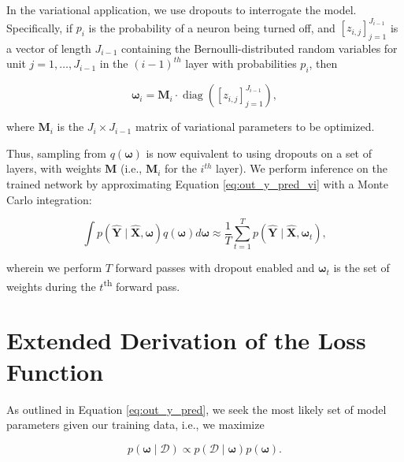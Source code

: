 In the variational application, we use dropouts to interrogate the model. 
Specifically, 
if $p_{i}$ is the probability of a neuron being turned off, and
$\left[z_{i, j}\right]_{j=1}^{J_{i-1}}$ is a vector of length $J_{i-1}$ containing the Bernoulli-distributed random variables for unit $j=1, \ldots, J_{i-1}$ in the $(i-1)^{th}$ layer with probabilities $p_i$, then

\begin{equation}
\boldsymbol{\omega}_{i} =\boldsymbol{M}_{i} \cdot \operatorname{diag}\left(\left[z_{i, j}\right]_{j=1}^{J_{i-1}}\right) ,
\label{eq:bernoulli}
\end{equation}

\noindent
where $\boldsymbol{M}_i$ is the $J_i \times J_{i-1}$ matrix of variational parameters to be optimized. 

Thus, sampling from $q(\boldsymbol{\omega})$ is now equivalent to using dropouts on a set of layers, with weights $\boldsymbol{M}$ %
(i.e., $\boldsymbol{M}_i$ for the $i^{th}$ layer). 
We perform inference on the trained network by 
approximating Equation \ref{eq:out_y_pred_vi} with a Monte Carlo integration: 

\begin{equation}
\int p(\boldsymbol{\hat{Y}} \mid \boldsymbol{\hat{X}}, \boldsymbol{\omega}) q(\boldsymbol{\omega}) d \boldsymbol{\omega} \approx \frac{1}{T} \sum_{t=1}^{T} p(\boldsymbol{\hat{Y}} \mid \boldsymbol{\hat{X}}, \boldsymbol{\omega}_t) ,
\end{equation}

\noindent
wherein we perform $T$ forward passes with dropout enabled and $\boldsymbol{\omega}_t$ is the set of weights during the $t$\textsuperscript{th} forward pass.

\section{Extended Derivation of the Loss Function} \label{sec_c2:ap:final_loss_deri}


As outlined in Equation \ref{eq:out_y_pred}, we seek the most likely set of model parameters given our training data, %
i.e., we maximize 

\begin{equation}
p(\boldsymbol{\omega} \mid \mathcal{D}) \propto p(\mathcal{D} \mid \boldsymbol{\omega})p(\boldsymbol{\omega}) .
\label{eq:bayes_rule}
\end{equation}

